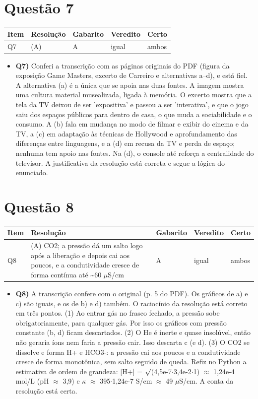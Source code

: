 \documentclass{article}%
\begin{document}
\section*{Questão 7}%
\begin{longtable}{@{}p{} p{} p{} p{} p{}@{}}\toprule Item & Resolução & Gabarito & Veredito & Certo \\ \midrule
Q7 & (A) & A & igual & ambos \\
\bottomrule\end{longtable}%
\begin{itemize}%
\item%
\textbf{Q7)} Conferi a transcrição com as páginas originais do PDF (figura da exposição Game Masters, excerto de Carreiro e alternativas a--d), e está fiel. A alternativa (a) é a única que se apoia nas duas fontes. A imagem mostra uma cultura material musealizada, ligada à memória. O excerto mostra que a tela da TV deixou de ser 'expositiva' e passou a ser 'interativa', e que o jogo saiu dos espaços públicos para dentro de casa, o que muda a sociabilidade e o consumo. A (b) fala em mudança no modo de filmar e exibir do cinema e da TV, a (c) em adaptação às técnicas de Hollywood e aprofundamento das diferenças entre linguagens, e a (d) em recusa da TV e perda de espaço; nenhuma tem apoio nas fontes. Na (d), o console até reforça a centralidade do televisor. A justificativa da resolução está correta e segue a lógica do enunciado.%
\end{itemize}%
\section*{Questão 8}%
\begin{longtable}{@{}p{} p{} p{} p{} p{}@{}}\toprule Item & Resolução & Gabarito & Veredito & Certo \\ \midrule
Q8 & (A) CO2; a pressão dá um salto logo após a liberação e depois cai aos poucos, e a condutividade cresce de forma contínua até \textasciitilde{}60 $\mu$S/cm & A & igual & ambos \\
\bottomrule\end{longtable}%
\begin{itemize}%
\item%
\textbf{Q8)} A transcrição confere com o original (p. 5 do PDF). Os gráficos de a) e c) são iguais, e os de b) e d) também. O raciocínio da resolução está correto em três pontos. (1) Ao entrar gás no frasco fechado, a pressão sobe obrigatoriamente, para qualquer gás. Por isso os gráficos com pressão constante (b, d) ficam descartados. (2) O He é inerte e quase insolúvel, então não geraria íons nem faria a pressão cair. Isso descarta c (e d). (3) O CO2 se dissolve e forma H+ e HCO3{-}: a pressão cai aos poucos e a condutividade cresce de forma monotônica, sem salto seguido de queda. Refiz no Python a estimativa de ordem de grandeza: {[}H+{]} = $\surd$(4,5e{-}7$\cdot$3,4e{-}2$\cdot$1) $\approx$ 1,24e{-}4 mol/L (pH $\approx$ 3,9) e $\kappa$ $\approx$ 395$\cdot$1,24e{-}7 S/cm $\approx$ 49 $\mu$S/cm. A conta da resolução está certa.%
\end{itemize}%
\end{document}
